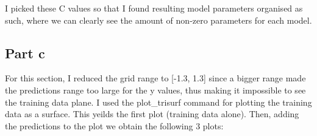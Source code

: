 \documentclass[10pt]{article}
\begin{document}
I picked these C values so that I found resulting model parameters organised as such,
where we can clearly see the amount of non-zero parameters for each model.

  
\subsection*{Part c}
For this section, I reduced the grid range to [-1.3, 1.3]
since a bigger range made the predictions range too large for the y values, thus making it 
impossible to see the training data plane. I used the plot\_trisurf command
for plotting the training data as a surface. This yeilds the first plot (training data alone).
Then, adding the predictions to the plot we obtain the following 3 plots:

\begin{figure}[H]       

\end{figure}
\end{document}
